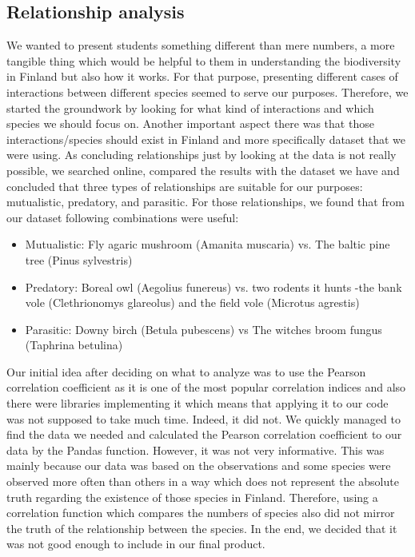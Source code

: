 \documentclass{article}
\begin{document}
\subsection{Relationship analysis}
We wanted to present students something different than mere numbers, a more tangible thing which would be helpful to them in understanding the biodiversity in Finland but also how it works. For that purpose, presenting different cases of interactions between different species seemed to serve our purposes. Therefore, we started the groundwork by looking for what kind of interactions and which species we should focus on. Another important aspect there was that those interactions/species should exist in Finland and more specifically dataset that we were using. As concluding relationships just by looking at the data is not really possible, we searched online, compared the results with the dataset we have and concluded that three types of relationships are suitable for our purposes: mutualistic, predatory, and parasitic. For those relationships, we found that from our dataset following combinations were useful:
\begin{itemize}
	\item Mutualistic: Fly agaric mushroom (Amanita muscaria) vs. The baltic pine tree (Pinus sylvestris)
	\item Predatory: Boreal owl (Aegolius funereus) vs. two rodents it hunts -the bank vole (Clethrionomys glareolus) and the field vole (Microtus agrestis)
	\item Parasitic: Downy birch (Betula pubescens) vs The witches broom fungus (Taphrina betulina)
\end{itemize}
\par
Our initial idea after deciding on what to analyze was to use the Pearson correlation coefficient as it is one of the most popular correlation indices and also there were libraries implementing it which means that applying it to our code was not supposed to take much time. Indeed, it did not. We quickly managed to find the data we needed and calculated the Pearson correlation coefficient to our data by the Pandas function. However, it was not very informative. This was mainly because our data was based on the observations and some species were observed more often than others in a way which does not represent the absolute truth regarding the existence of those species in Finland. Therefore, using a correlation function which compares the numbers of species also did not mirror the truth of the relationship between the species. In the end, we decided that it was not good enough to include in our final product.
\end{document}
